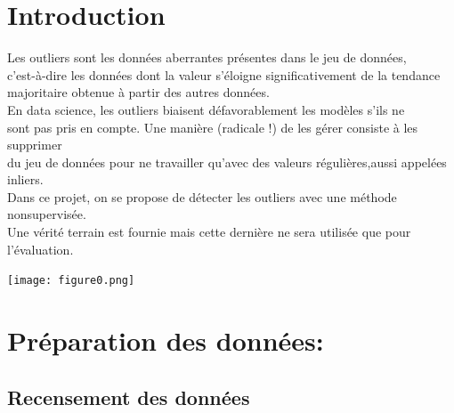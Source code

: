 \documentclass[a4paper]{article}
\makeatletter
\newenvironment{expl}{%
  \begin{list}{}{%
      \small\itshape%
      \topsep\z@%
      \listparindent0pt%
      \parsep0.75\baselineskip%
      \setlength{\leftmargin}{20mm}%
      \setlength{\rightmargin}{20mm}%
    }
  \item[]}%
  {\end{list}}
\makeatother
\begin{document}
\sloppy




\clearpage
\restoregeometry





\centering\section{Introduction}





Les outliers sont les données aberrantes présentes dans le jeu de données,\\c’est-à-dire les données dont la valeur s’éloigne significativement de la tendance\\ majoritaire obtenue à partir des autres données.\\
En data science, les outliers biaisent défavorablement les modèles s’ils ne \\sont pas pris en compte. Une manière (radicale !) de les gérer consiste à les supprimer\\ du jeu de données pour ne travailler qu’avec des valeurs régulières,aussi appelées inliers.\\
Dans ce projet, on se propose de détecter les outliers avec une méthode nonsupervisée.\\
Une vérité terrain est fournie mais cette dernière ne sera utilisée que pour l’évaluation.

\texttt{[image: figure0.png]}\\


\newpage

\section{Préparation des données:}

\subsection{Recensement des données }\label{sec-shm}
\end{document}
